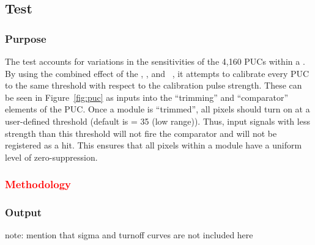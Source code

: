 
\newpage

\subsection{\trimming Test}
\label{ss:trimming}

\subsubsection{Purpose}

The \trimming test accounts for variations in the sensitivities of the 4,160 PUCs within a \roc.
By using the combined effect of the \vthrcomp, \vtrim, and \trimbit~\dacs,
it attempts to calibrate every PUC to the same threshold with respect to the calibration pulse strength.
These \dacs can be seen in Figure~\ref{fig:puc} as inputs into the ``trimming'' and ``comparator'' elements of the PUC.
Once a module is ``trimmed'', all pixels should turn on at a user-defined threshold (default is \vcal = 35 (low range)).
Thus, input signals with less strength than this threshold will not fire the comparator and will not be registered as a hit.
This ensures that all pixels within a module have a uniform level of zero-suppression.

\subsubsection{\textcolor{red}{Methodology}}
\subsubsection{Output}

note: mention that sigma and turnoff curves are not included here


